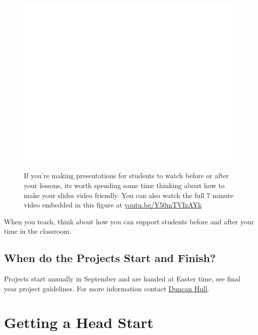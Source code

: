 \documentclass[
  12pt,
]{book}
\begin{document}
\begin{figure}

{\centering \href{https://www.youtube.com/embed/Y50mTVIzAYk}{\includegraphics[width=0.99\linewidth]{duncan-hull_files/figure-latex/srp-fig-1} }

}

\caption{If you're making presentations for students to watch before or after your lessons, its worth spending some time thinking about how to make your slides video friendly. You can also watch the full 7 minute video embedded in this figure at \href{https://youtu.be/Y50mTVIzAYk}{youtu.be/Y50mTVIzAYk} \citep{youtube-srp}}\label{fig:srp-fig}
\end{figure}



When you teach, think about how you can support students before and after your time in the classroom.

\hypertarget{finishing}{%
\subsection{When do the Projects Start and Finish?}\label{finishing}}

Projects start annually in September and are handed at Easter time, see final year project guidelines. For more information contact \protect\hyperlink{Contact}{Duncan Hull}.

\hypertarget{getting-a-head-start}{%
\section{Getting a Head Start}\label{getting-a-head-start}}
\end{document}
